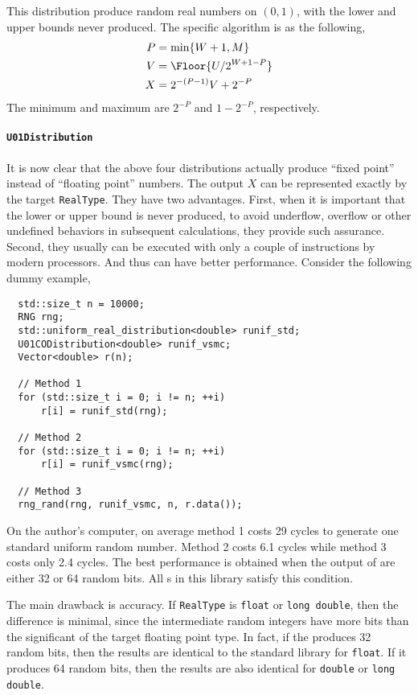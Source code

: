 This distribution produce random real numbers on $(0, 1)$, with the lower and
upper bounds never produced. The specific algorithm is as the following,
\begin{align*}
  P &= \min\{W + 1, M\} \\
  V &= \Floor{U / 2^{W + 1 - P}} \\
  X &= 2^{-(P - 1)} V + 2^{-P}
\end{align*}
The minimum and maximum are $2^{-P}$ and $1 - 2^{-P}$, respectively.

\paragraph{\texttt{U01Distribution}}

It is now clear that the above four distributions actually produce ``fixed
point'' instead of ``floating point'' numbers. The output $X$ can be
represented exactly by the target \verb|RealType|. They have two advantages.
First, when it is important that the lower or upper bound is never produced, to
avoid underflow, overflow or other undefined behaviors in subsequent
calculations, they provide such assurance. Second, they usually can be executed
with only a couple of instructions by modern processors. And thus can have
better performance. Consider the following dummy example,
\begin{Verbatim}
  std::size_t n = 10000;
  RNG rng;
  std::uniform_real_distribution<double> runif_std;
  U01CODistribution<double> runif_vsmc;
  Vector<double> r(n);

  // Method 1
  for (std::size_t i = 0; i != n; ++i)
      r[i] = runif_std(rng);

  // Method 2
  for (std::size_t i = 0; i != n; ++i)
      r[i] = runif_vsmc(rng);

  // Method 3
  rng_rand(rng, runif_vsmc, n, r.data());
\end{Verbatim}
On the author's computer, on average method 1 costs 29 cycles to generate one
standard uniform random number. Method 2 costs 6.1 cycles while method 3 costs
only 2.4 cycles. The best performance is obtained when the output of \rng are
either 32 or 64 random bits. All \rng{}s in this library satisfy this
condition.

The main drawback is accuracy. If \verb|RealType| is \verb|float| or
\verb|long double|, then the difference is minimal, since the intermediate
random integers have more bits than the significant of the target floating
point type. In fact, if the \rng produces 32 random bits, then the results are
identical to the standard library for \verb|float|. If it produces 64 random
bits, then the results are also identical for \verb|double| or
\verb|long double|.

